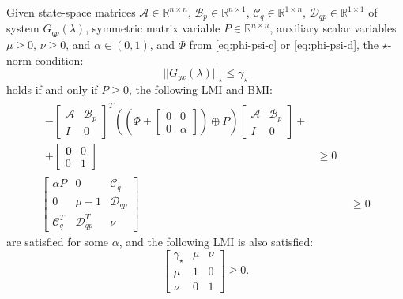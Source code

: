 \begin{thm} \label{thm:l1}
	Given state-space matrices $\mathcal{A} \in \mathbb{R}^{n \times n}$, $\mathcal{B}_p \in \mathbb{R}^{n \times 1}$, $\mathcal{C}_q \in \mathbb{R}^{1 \times n}$, $\mathcal{D}_{qp} \in \mathbb{R}^{1 \times 1}$ of system $G_{qp}(\lambda)$, symmetric matrix variable $P \in \mathbb{R}^{n \times n}$, auxiliary scalar variables $\mu \geq 0$, $\nu \geq 0$, and $\alpha \in (0, 1)$, and $\Phi$ from \autoref{eq:phi-psi-c} or \ref{eq:phi-psi-d}, the $\star$-norm condition:
	\begin{equation*}
		||G_{yx}(\lambda)||_\star \leq \gamma_\star
	\end{equation*}
	holds if and only if $P \geq 0$, the following \gls{LMI} and \gls{BMI}:
	\begin{align}
		\begin{split}
			-\begin{bmatrix}
				\mathcal{A} & \mathcal{B}_p \\
				I & 0
			\end{bmatrix}^T
			\left(\left(\Phi + 
			\begin{bmatrix}
				0 & 0 \\
				0 & \alpha
			\end{bmatrix}\right) \oplus P\right)
			\begin{bmatrix}
				\mathcal{A} & \mathcal{B}_p \\
				I & 0
			\end{bmatrix} + \\
			+\begin{bmatrix}
				\mathbf{0} & 0 \\
				0 & 1
			\end{bmatrix} &\geq 0 \label{eq:lmi1-1}
		\end{split} \\
		\begin{bmatrix}
			\alpha P & 0 & \mathcal{C}_q \\
			0 & \mu - 1 & \mathcal{D}_{qp} \\
			\mathcal{C}_q^T & \mathcal{D}_{qp}^T & \nu
		\end{bmatrix} &\geq 0 \label{eq:lmi1-2}
	\end{align}
	are satisfied for some $\alpha$, and the following \gls{LMI} is also satisfied:
	\begin{equation}
		\begin{bmatrix}
			\gamma_\star & \mu & \nu \\
			\mu & 1 & 0 \\
			\nu & 0 & 1
		\end{bmatrix} \geq 0 \label{eq:lmi1-3}.
	\end{equation}
\end{thm}

